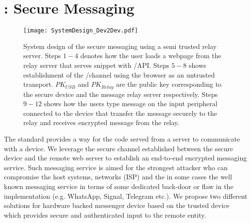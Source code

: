 \section{\toolname: Secure Messaging}
\label{sec:secureMessage}


\begin{figure*}[t]
 \centering
 \texttt{[image: SystemDesign\_Dev2Dev.pdf]}
 \caption{System design of the secure messaging using a semi trusted relay server. Steps $1-4$ denotes how the user loads a webpage from the relay server that serves \js snippet with \webusb/\webbt API. Steps $5-8$ shows establishment of the \ssl/\tls channel using the browser as an untrusted transport. $PK_{USB}$ and $PK_{Relay}$ are the public key corresponding to the secure \usb device and the message relay server respectively. Steps $9-12$ shows how the users type message on the input peripheral connected to the \usb device that transfer the message securely to the relay and receives encrypted message from the relay.}
 \label{fig:systemDesignDedicated}
\end{figure*}


The \webusb standard provides a way for the \js code served from a \https server to communicate with a \usb device. We leverage the secure channel established between the secure \usb device and the remote web server to establish an end-to-end encrypted messaging service. Such messaging service is aimed for the strongest attacker who can compromise the host systems, networks (ISP) and the in some cases the well known messaging service in terms of some dedicated back-door or flaw in the implementation (e.g. WhatsApp, Signal, Telegram etc.). We propose two different solutions for hardware backed messenger device based on the trusted \usb device which provides secure and authenticated input to the remote entity.


